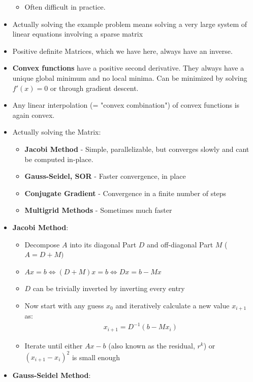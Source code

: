 \documentclass{scrartcl}
\begin{document}
\begin{itemize}
\begin{itemize}
        \item Often difficult in practice.
    \end{itemize}
    \item Actually solving the example problem means solving a very large system of linear equations involving a sparse matrix
    \item Positive definite Matrices, which we have here, always have an inverse.
    \item \textbf{Convex functions} have a positive second derivative. They always have a unique global minimum and no local minima. Can be minimized by solving $f'(x) = 0$ or through gradient descent.
    \item Any linear interpolation (= "convex combination") of convex functions is again convex.
    \item Actually solving the Matrix:
    \begin{itemize}
        \item \textbf{Jacobi Method} - Simple, parallelizable, but converges slowly and cant be computed in-place.
        \item \textbf{Gauss-Seidel, SOR} - Faster convergence, in place
        \item \textbf{Conjugate Gradient} - Convergence in a finite number of steps
        \item \textbf{Multigrid Methods} - Sometimes much faster
    \end{itemize}
    \item \textbf{Jacobi Method}:
    \begin{itemize}
        \item Decompose $A$ into its diagonal Part $D$ and off-diagonal Part $M$ ($A = D+M)$
        \item $Ax = b \Leftrightarrow (D+M)x = b \Leftrightarrow Dx = b - Mx$
        \item $D$ can be trivially inverted by inverting every entry
        \item Now start with any guess $x_0$ and iteratively calculate a new value $x_{i+1}$ as:
        \begin{align*}
            x_{i+1} = D^{-1}(b - Mx_i)    
        \end{align*}
        \item Iterate until either $Ax - b$ (also known as the residual, $r^k$) or $(x_{i+1}-x_i)^2$ is small enough 
    \end{itemize}
    \item \textbf{Gauss-Seidel Method}:
    \begin{itemize}

\end{itemize}
\end{itemize}
\end{document}
